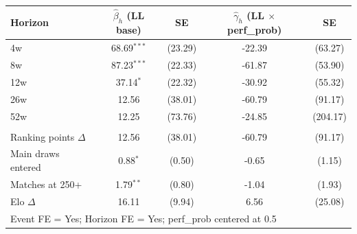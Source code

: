 \begin{tabular}{l c c c c}
\toprule
Horizon & $\hat{\beta}_h$ (LL base) & SE & $\hat{\gamma}_h$ (LL $\times$ perf\_prob) & SE \\
\midrule
4w & 68.69$^{***}$ & (23.29) & -22.39 & (63.27) \\
8w & 87.23$^{***}$ & (22.33) & -61.87 & (53.90) \\
12w & 37.14$^{*}$ & (22.32) & -30.92 & (55.32) \\
26w & 12.56 & (38.01) & -60.79 & (91.17) \\
52w & 12.25 & (73.76) & -24.85 & (204.17) \\
\addlinespace
\midrule
\multicolumn{5}{l}{\textit{All outcomes at 26w}} \\
Ranking points $\Delta$ & 12.56 & (38.01) & -60.79 & (91.17) \\
Main draws entered & 0.88$^{*}$ & (0.50) & -0.65 & (1.15) \\
Matches at 250+ & 1.79$^{**}$ & (0.80) & -1.04 & (1.93) \\
Elo $\Delta$ & 16.11 & (9.94) & 6.56 & (25.08) \\
\midrule
\multicolumn{5}{l}{Event FE = Yes; Horizon FE = Yes; perf\_prob centered at 0.5} \\
\bottomrule
\end{tabular}
